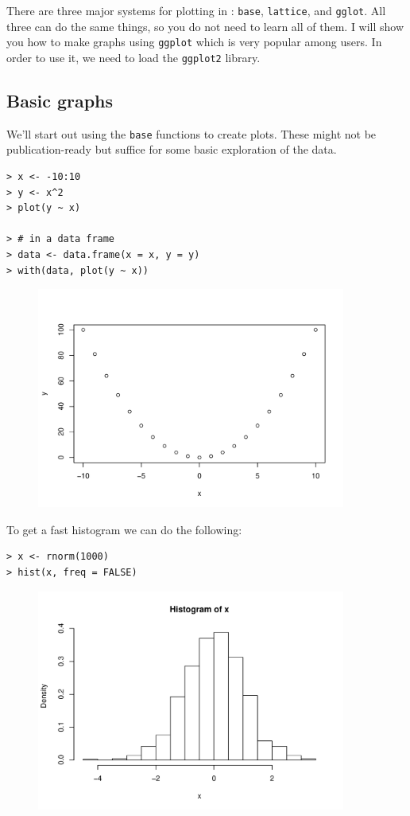 There are three major systems for plotting in \R: \texttt{base}, \texttt{lattice}, and \texttt{gglot}. All three can do the same things, so you do not need to learn all of them. I will show you how to make graphs using \texttt{ggplot} which is very popular among \R users. In order to use it, we need to load the \texttt{ggplot2} library.

\subsection{Basic graphs}

We'll start out using the \texttt{base} functions to create plots. These might not be publication-ready but suffice for some basic exploration of the data.

\begin{lstlisting}
> x <- -10:10
> y <- x^2
> plot(y ~ x)

> # in a data frame
> data <- data.frame(x = x, y = y)
> with(data, plot(y ~ x))
\end{lstlisting}

\begin{figure}[h]
\centering
\includegraphics[width=4in]{plots/01.pdf} 
\end{figure}

To get a fast histogram we can do the following:

\begin{lstlisting}
> x <- rnorm(1000)
> hist(x, freq = FALSE)
\end{lstlisting}

\begin{figure}[h]
\centering
\includegraphics[width=4in]{plots/02.pdf} 
\end{figure}

